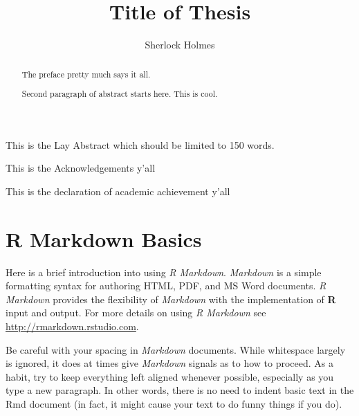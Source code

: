 \documentclass[12pt,twoside]{Mactemplate}
\title{Title of Thesis}
\author{Sherlock Holmes}
\theoremstyle{definition}
\theoremstyle{definition}
\theoremstyle{definition}
\theoremstyle{remark}
\begin{document}
\frontmatter %
  \maketitle

  \begin{layabstract}
    This is the Lay Abstract which should be limited to 150 words.
    \thispagestyle{plain}
  \end{layabstract}
  \begin{abstract}
    The preface pretty much says it all. \par
    
    Second paragraph of abstract starts here. This is cool.
    \thispagestyle{plain}
  \end{abstract}
  \begin{acknowledgements}
    This is the Acknowledgements y'all
    \thispagestyle{plain}
  \end{acknowledgements}
  \hypersetup{linkcolor=black}
  \setcounter{tocdepth}{2}
  \tableofcontents
  \thispagestyle{plain}

  \listoftables
  \thispagestyle{plain}

  \listoffigures
  \thispagestyle{plain}
  \begin{declaration}
    \label{doaac} This is the declaration of academic achievement y'all
    \thispagestyle{plain}
  \end{declaration}


\mainmatter %

\hypertarget{rmd-basics}{\chapter{R Markdown Basics}\label{rmd-basics}}

Here is a brief introduction into using \emph{R Markdown}.
\emph{Markdown} is a simple formatting syntax for authoring HTML, PDF,
and MS Word documents. \emph{R Markdown} provides the flexibility of
\emph{Markdown} with the implementation of \textbf{R} input and output.
For more details on using \emph{R Markdown} see
\url{http://rmarkdown.rstudio.com}.

Be careful with your spacing in \emph{Markdown} documents. While
whitespace largely is ignored, it does at times give \emph{Markdown}
signals as to how to proceed. As a habit, try to keep everything left
aligned whenever possible, especially as you type a new paragraph. In
other words, there is no need to indent basic text in the Rmd document
(in fact, it might cause your text to do funny things if you do).
\end{document}
